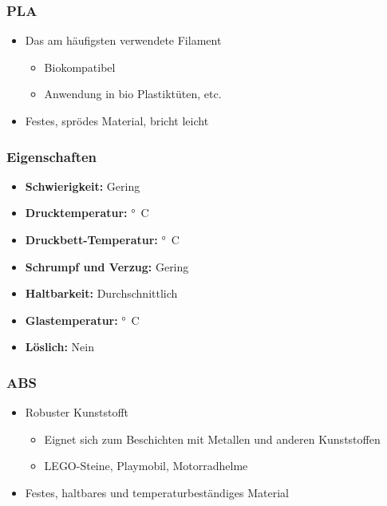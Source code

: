 {
\begin{frame}
  \frametitle{PLA}
  \pause
  \begin{itemize}
    \item Das am häufigsten verwendete Filament \pause
    \begin{itemize}
      \item Biokompatibel
      \item Anwendung in bio Plastiktüten, etc. \pause
    \end{itemize}
    \item Festes, sprödes Material, bricht leicht
  \end{itemize}
\end{frame}

\begin{frame}
  \frametitle{Eigenschaften}
  \pause
  \begin{itemize}
    \item \textbf{Schwierigkeit:} Gering
    \item \textbf{Drucktemperatur:} \unit[180 - 230]{°C}
    \item \textbf{Druckbett-Temperatur:} \unit[20 - 60]{°C}
    \item \textbf{Schrumpf und Verzug:} Gering
    \item \textbf{Haltbarkeit:} Durchschnittlich
    \item \textbf{Glastemperatur:} \unit[45-65]{°C}
    \item \textbf{Löslich:} Nein
  \end{itemize}
\end{frame}

\begin{frame}
  \frametitle{ABS}
  \pause
  \begin{itemize}
    \item Robuster Kunststofft \pause
    \begin{itemize}
      \item Eignet sich zum Beschichten mit Metallen und anderen Kunststoffen
      \item LEGO-Steine, Playmobil, Motorradhelme \pause
    \end{itemize}
    \item Festes, haltbares und temperaturbeständiges Material
  \end{itemize}
\end{frame}

}

